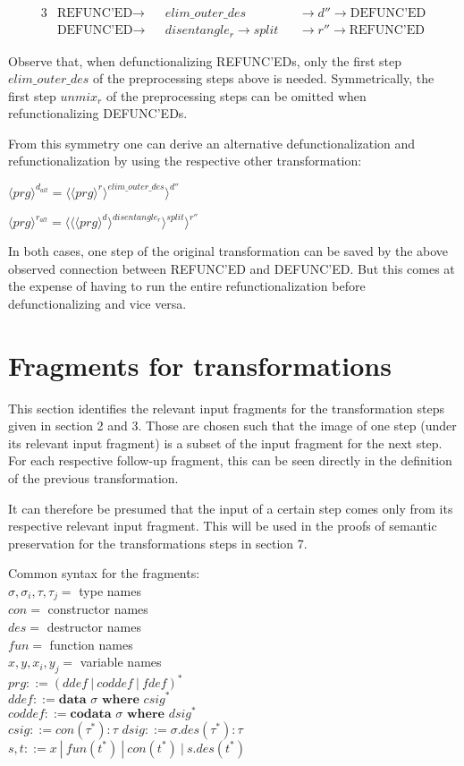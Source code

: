 \documentclass[11pt]{article} %
\begin{document}
\begin{alignat*}{3}
&\textrm{REFUNC'ED} \rightarrow && elim\_outer\_des &&\rightarrow d'' \rightarrow \textrm{DEFUNC'ED} \\
&\textrm{DEFUNC'ED} \rightarrow && disentangle_r \rightarrow split && \rightarrow r'' \rightarrow \textrm{REFUNC'ED}
\end{alignat*}

Observe that, when defunctionalizing REFUNC'EDs, only the first step $elim\_outer\_des$ of the preprocessing steps above is needed. Symmetrically, the first step $unmix_r$ of the preprocessing steps can be omitted when refunctionalizing DEFUNC'EDs.

From this symmetry one can derive an alternative defunctionalization and refunctionalization by using the respective other transformation:

$\langle prg \rangle^{d_{alt}} = \langle \langle prg \rangle^r \rangle^{elim\_outer\_des} \rangle^{d''}$

$\langle prg \rangle^{r_{alt}} = \langle \langle \langle prg \rangle^d \rangle^{disentangle_r} \rangle^{split} \rangle^{r''}$

In both cases, one step of the original transformation can be saved by the above observed connection between REFUNC'ED and DEFUNC'ED. But this comes at the expense of having to run the entire refunctionalization before defunctionalizing and vice versa.

\section{Fragments for transformations}

This section identifies the relevant input fragments for the transformation steps given in section 2 and 3. Those are chosen such that the image of one step (under its relevant input fragment) is a subset of the input fragment for the next step. For each respective follow-up fragment, this can be seen directly in the definition of the previous transformation.

It can therefore be presumed that the input of a certain step comes only from its respective relevant input fragment. This will be used in the proofs of semantic preservation for the transformations steps in section 7.

Common syntax for the fragments:\\
$\sigma, \sigma_i, \tau, \tau_j = $ type names\\
$con = $ constructor names\\
$des = $ destructor names\\
$fun = $ function names\\
$x, y, x_i, y_j = $ variable names\\
$prg ::= (ddef ~ | ~ coddef ~ | ~  fdef)^*$\\
$ddef ::= \textbf{data } \sigma \textbf{ where } csig^*$\\
$coddef ::= \textbf{codata } \sigma \textbf{ where } dsig^*$\\
$csig ::= con(\tau^*): \tau$
$dsig ::= \sigma.des(\tau^*): \tau$
$s, t ::= x ~ | ~ fun(t^*) ~ | ~ con(t^*) ~ | ~ s.des(t^*)$\\
\end{document}

